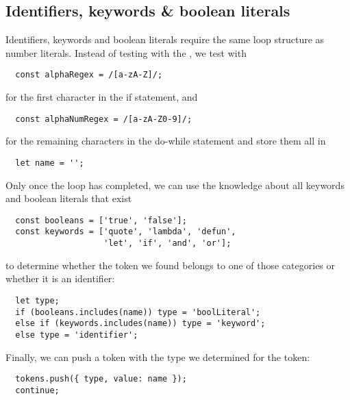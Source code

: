 \subsection{Identifiers, keywords \& boolean literals}
Identifiers, keywords and boolean literals require
the same loop structure as number literals.
Instead of testing with the , we test with
\begin{verbatim}
  const alphaRegex = /[a-zA-Z]/;
\end{verbatim}
for the first character in the if statement, and
\begin{verbatim}
  const alphaNumRegex = /[a-zA-Z0-9]/;
\end{verbatim}
for the remaining characters in the do-while statement and store them all in
\begin{verbatim}
  let name = '';
\end{verbatim}

Only once the loop has completed,
we can use the knowledge about all keywords and boolean literals that exist
\begin{verbatim}
  const booleans = ['true', 'false'];
  const keywords = ['quote', 'lambda', 'defun',
                    'let', 'if', 'and', 'or'];
\end{verbatim}
to determine whether the token we found belongs to one of those categories
or whether it is an identifier:
\begin{verbatim}
  let type;
  if (booleans.includes(name)) type = 'boolLiteral';
  else if (keywords.includes(name)) type = 'keyword';
  else type = 'identifier';
\end{verbatim}

Finally, we can push a token with the type we determined for the token:
\begin{verbatim}
  tokens.push({ type, value: name });
  continue;
\end{verbatim}
